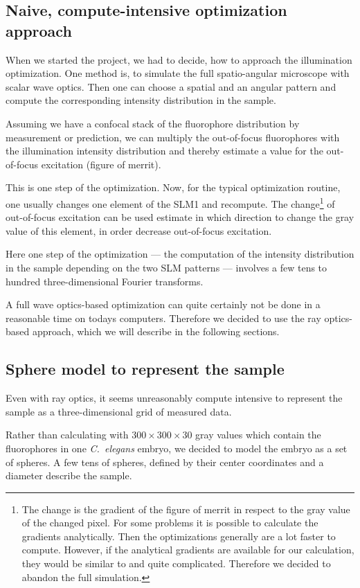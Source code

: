 \subsection{Naive, compute-intensive optimization approach}
When we started the project, we had to decide, how to approach the
illumination optimization. One method is, to simulate the full
spatio-angular microscope with scalar wave optics. Then one can choose
a spatial and an angular pattern and compute the corresponding
intensity distribution in the sample.

Assuming we have a confocal stack of the fluorophore distribution by
measurement or prediction, we can multiply the out-of-focus
fluorophores with the illumination intensity distribution and thereby
estimate a value for the out-of-focus excitation (figure of merrit).

This is one step of the optimization. Now, for the typical
optimization routine, one usually changes one element of the SLM1 and
recompute. The change\footnote{The change is the gradient of the
  figure of merrit in respect to the gray value of the changed pixel.
  For some problems it is possible to calculate the gradients
  analytically. Then the optimizations generally are a lot faster to
  compute. However, if the analytical gradients are available for our
  calculation, they would be similar to \citet{Thurman2009} and quite
  complicated. Therefore we decided to abandon the full simulation.}
of out-of-focus excitation can be used estimate in which direction to
change the gray value of this element, in order decrease out-of-focus
excitation.

Here one step of the optimization --- the computation of the intensity
distribution in the sample depending on the two SLM patterns ---
involves a few tens to hundred three-dimensional Fourier transforms.

A full wave optics-based optimization can quite certainly not be done
in a reasonable time on todays computers. Therefore we decided to use
the ray optics-based approach, which we will describe in the following
sections.

\subsection{Sphere model to represent the sample}
\label{sec:shadow-map}
Even with ray optics, it seems unreasonably compute intensive to
represent the sample as a three-dimensional grid of measured data.

Rather than calculating with $300\times 300\times 30$ gray values
which contain the fluorophores in one \emph{C.~elegans} embryo, we
decided to model the embryo as a set of spheres.  A few tens of
spheres, defined by their center coordinates and a diameter describe
the sample.

